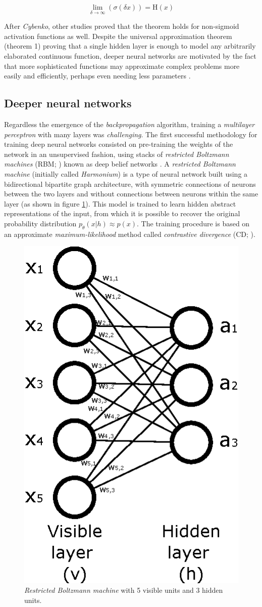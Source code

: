 \begin{equation}
	\label{eq:sigmoidToHeavyside}
	\lim_{\delta \rightarrow \infty} (\sigma(\delta x)) = \mathrm{H}(x)
\end{equation}



After \textit{Cybenko}, other studies \autocite{Leshno1993, pinkus1999} proved that the theorem holds for non-sigmoid activation functions as well. Despite the universal approximation theorem (theorem 1) proving that a single hidden layer is enough to model any arbitrarily elaborated continuous function, deeper neural networks are motivated by the fact that more sophisticated functions may approximate complex problems more easily and efficiently, perhaps even needing less parameters \autocite{nguyen21}.



\subsection{Deeper neural networks} \label{sec:deepernn}
Regardless the emergence of the \textit{backpropagation} algorithm, training a \textit{multilayer perceptron} with many layers was \textit{challenging}. The first successful methodology for training deep neural networks consisted on pre-training the weights of the network in an unsupervised fashion, using stacks of \textit{restricted Boltzmann machines} (RBM; \citealp{Smolensky1986}) known as deep belief networks \autocite{hinton2006, Bengio2007}. A \textit{restricted Boltzmann machine} (initially called \textit{Harmonium}) is a type of neural network built using a bidirectional bipartite graph architecture, with symmetric connections of neurons between the two layers and without connections between neurons within the same layer (as shown in figure \ref{fig:rbm}). This model is trained to learn hidden abstract representations of the input, from which it is possible to recover the original probability distribution $p_\theta(x|h) \approx p(x)$. The training procedure is based on an approximate \textit{maximum-likelihood} method called \textit{contrastive divergence} (CD; \citealp{hinton2002}).

\begin{figure}[h!]
	\centering
	\includegraphics[width=0.3\linewidth]{background/images/rbm}
	\caption[\textit{Restricted Boltzmann machine}]{\textit{Restricted Boltzmann machine} with 5 visible units and 3 hidden units.}
	\label{fig:rbm}
\end{figure}


